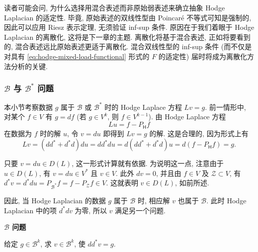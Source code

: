\begin{Remark}\label{rem:hodge-mixed-discretization-motivation}
{读者可能会问, 为什么选择用混合表述而非原始弱表述来确立抽象 Hodge Laplacian 的适定性. 毕竟, 原始表述的双线性型由 Poincaré 不等式可知是强制的, 因此可以应用 Riesz 表示定理, 无须验证 inf-sup 条件. 原因在于我们着眼于 Hodge Laplacian 的离散化, 这将是下一章的主题. 离散化将基于混合表述, 正如将要看到的, 混合表述远比原始表述更适于离散化. 混合双线性型的 inf-sup 条件 (而不仅是对具有 \eqref{eq:hodge-mixed-load-functional} 形式的 $F$ 的适定性) 届时将成为离散化方法分析的关键.}
\end{Remark}

\subsubsection{{$\mathcal B$ 与 $\mathcal B^*$ 问题}}\label{subsec:boundary-coboundary-problems}

{本小节考察数据 $g$ 属于 $\mathcal B$ 或 $\mathcal B^*$ 时的 Hodge Laplace 方程 $Lv=g$. 前一情形中, 对某个 $f\in V$ 有 $g=df$ (若 $g\in V^k$, 则 $f\in V^{k-1}$). 由 Hodge Laplace 方程}
\begin{equation}\label{eq:hodge-boundary-problem-potential}
Lu=f-P_{\mathsf H}f
\end{equation}
{在数据为 $f$ 时的解 $u$, 令 $v=du$ 即得到 $Lv=g$ 的解. 这是合理的, 因为形式上有}
\[
Lv=(dd^*+d^*d)du=dd^*du=d(dd^*+d^*d)u=d(f-P_{\mathsf H}f)=g.
\]

{只要 $v=du\in D(L)$, 这一形式计算就有依据. 为说明这一点, 注意由于 $u\in D(L)$, 有 $v=du\in V^*$ 且 $v\in V$. 此外 $dv=0$, 并且由 $f\in V$ 及 $\mathcal Z\subset V$, 有 $d^*v=d^*du=P_{\mathcal B^*}f=f-P_{\mathcal Z}f\in V$. 这就表明 $v\in D(L)$, 如前所述.}

{因此, 当 Hodge Laplacian 的数据 $g$ 属于 $\mathcal B$ 时, 相应解 $v$ 也属于 $\mathcal B$. 此时 Hodge Laplacian 中的项 $d^*dv$ 为零, 所以 $v$ 满足另一个问题.}

\medskip\noindent\textbf{{$\mathcal B$ 问题}}\par
{给定 $g\in\mathcal B^k$, 求 $v\in\mathcal B^k$, 使 $dd^*v=g$.}

